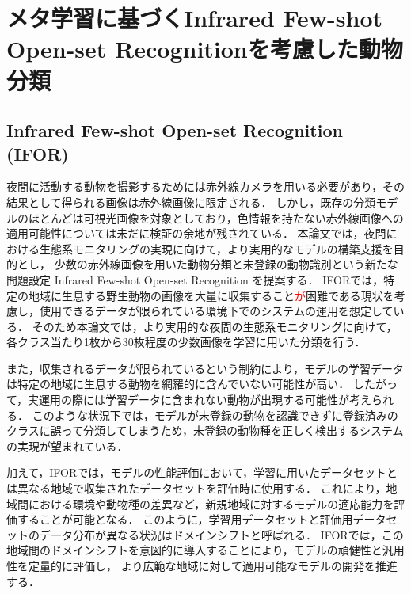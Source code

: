 \documentclass[a4paper,11pt,nomag]{jsreport}
\begin{document}
\setcounter{chapter}{3}

\chapter*{メタ学習に基づくInfrared Few-shot Open-set Recognitionを考慮した動物分類}

\section{Infrared Few-shot Open-set Recognition (IFOR)}
\label{sec:ifor}

夜間に活動する動物を撮影するためには赤外線カメラを用いる必要があり，その結果として得られる画像は赤外線画像に限定される．
しかし，既存の分類モデルのほとんどは可視光画像を対象としており，色情報を持たない赤外線画像への適用可能性については未だに検証の余地が残されている．
本論文では，夜間における生態系モニタリングの実現に向けて，より実用的なモデルの構築支援を目的とし，
少数の赤外線画像を用いた動物分類と未登録の動物識別という新たな問題設定 Infrared Few-shot Open-set Recognition を提案する．
IFORでは，特定の地域に生息する野生動物の画像を大量に収集すること\textcolor{red}{が}困難である現状を考慮し，使用できるデータが限られている環境下でのシステムの運用を想定している．
そのため本論文では，より実用的な夜間の生態系モニタリングに向けて，
各クラス当たり1枚から30枚程度の少数画像を学習に用いた分類を行う．

また，収集されるデータが限られているという制約により，モデルの学習データは特定の地域に生息する動物を網羅的に含んでいない可能性が高い．
したがって，実運用の際には学習データに含まれない動物が出現する可能性が考えられる．
このような状況下では，モデルが未登録の動物を認識できずに登録済みのクラスに誤って分類してしまうため，未登録の動物種を正しく検出するシステムの実現が望まれている．


加えて，IFORでは，モデルの性能評価において，学習に用いたデータセットとは異なる地域で収集されたデータセットを評価時に使用する．
これにより，地域間における環境や動物種の差異など，新規地域に対するモデルの適応能力を評価することが可能となる．
このように，学習用データセットと評価用データセットのデータ分布が異なる状況はドメインシフトと呼ばれる．
IFORでは，この地域間のドメインシフトを意図的に導入することにより，モデルの頑健性と汎用性を定量的に評価し，
より広範な地域に対して適用可能なモデルの開発を推進する．
\end{document}
